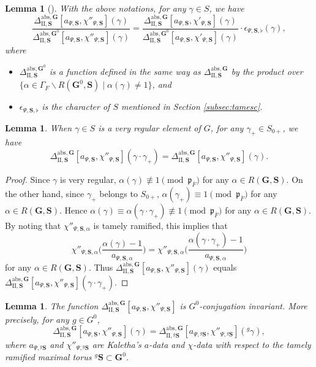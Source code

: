 \documentclass{amsart}
\newcommand{\abs}{\mathrm{abs}}
\newcommand{\ol}{\overline}
\newcommand{\mfp}{\mathfrak{p}}
\newcommand{\bfG}{\mathbf{G}}
\newcommand{\bfS}{\mathbf{S}}
\newcommand{\II}{\mathrm{II}}
\theoremstyle{plain}
\newtheorem{lem}[thm]{Lemma}
\theoremstyle{definition}
\theoremstyle{remark}
\theoremstyle{theorem}
\begin{document}
\begin{lem}[{\cite[(Proof of) Lemma 4.2.7]{FKS21}}]\label{lem:tran-diff}
With the above notations, for any $\gamma\in S$, we have
\[
\frac{\Delta_{\II,\bfS}^{\abs,\bfG}[a_{\Psi,\bfS},\chi''_{\Psi,\bfS}](\gamma)}{\Delta_{\II,\bfS}^{\abs,\bfG^{0}}[a_{\Psi,\bfS},\chi''_{\Psi,\bfS}](\gamma)}
=\frac{\Delta_{\II,\bfS}^{\abs,\bfG}[a_{\Psi,\bfS},\chi'_{\Psi,\bfS}](\gamma)}{\Delta_{\II,\bfS}^{\abs,\bfG^{0}}[a_{\Psi,\bfS},\chi'_{\Psi,\bfS}](\gamma)}
\cdot\epsilon_{\Psi,\bfS,\flat}(\gamma),
\]
where
\begin{itemize}
\item
$\Delta_{\II,\bfS}^{\abs,\bfG^{0}}$ is a function defined in the same way as $\Delta_{\II,\bfS}^{\abs,\bfG}$ by the product over $\{\alpha\in\Gamma_{F}\backslash R(\bfG^{0},\bfS) \mid \alpha(\gamma)\neq1\}$, and
\item
 $\epsilon_{\Psi,\bfS,\flat}$ is the character of $S$ mentioned in Section \ref{subsec:tamesc}.
 \end{itemize}
\end{lem}


\begin{lem}\label{lem:tran-translation}
When $\gamma\in S$ is a very regular element of $G$, for any $\gamma_{+}\in S_{0+}$, we have
\[
\Delta_{\II,\bfS}^{\abs,\bfG}[a_{\Psi,\bfS},\chi''_{\Psi,\bfS}](\gamma\cdot\gamma_{+})
=\Delta_{\II,\bfS}^{\abs,\bfG}[a_{\Psi,\bfS},\chi''_{\Psi,\bfS}](\gamma).
\]
\end{lem}

\begin{proof}
Since $\gamma$ is very regular, $\alpha(\gamma)\not\equiv1 \pmod{\mfp_{\ol{F}}}$ for any $\alpha\in R(\bfG,\bfS)$.
On the other hand, since $\gamma_{+}$ belongs to $S_{0+}$, $\alpha(\gamma_{+})\equiv1 \pmod{\mfp_{\ol{F}}}$ for any $\alpha\in R(\bfG,\bfS)$.
Hence $\alpha(\gamma)\equiv\alpha(\gamma\cdot\gamma_{+})\not\equiv1 \pmod{\mfp_{\ol{F}}}$ for any $\alpha\in R(\bfG,\bfS)$.
By noting that $\chi''_{\Psi,\bfS,\alpha}$ is tamely ramified, this implies that
\[
\chi''_{\Psi,\bfS,\alpha}\biggl(\frac{\alpha(\gamma)-1}{a_{\Psi,\bfS,\alpha}}\biggr)
=
\chi''_{\Psi,\bfS,\alpha}\biggl(\frac{\alpha(\gamma\cdot\gamma_{+})-1}{a_{\Psi,\bfS,\alpha}}\biggr)
\]
for any $\alpha\in R(\bfG,\bfS)$.
Thus $\Delta_{\II,\bfS}^{\abs,\bfG}[a_{\Psi,\bfS},\chi''_{\Psi,\bfS}](\gamma)$ equals $\Delta_{\II,\bfS}^{\abs,\bfG}[a_{\Psi,\bfS},\chi''_{\Psi,\bfS}](\gamma\cdot\gamma_{+})$.
\end{proof}

\begin{lem}\label{lem:tran-conj}
The function $\Delta_{\II,\bfS}^{\abs,\bfG}[a_{\Psi,\bfS},\chi''_{\Psi,\bfS}]$ is $G^{0}$-conjugation invariant.
More precisely, for any $g\in G^{0}$, 
\[
\Delta_{\II,\bfS}^{\abs,\bfG}[a_{\Psi,\bfS},\chi''_{\Psi,\bfS}](\gamma)
=\Delta_{\II,{}^{g}\bfS}^{\abs,\bfG}[a_{\Psi,{}^{g}\bfS},\chi''_{\Psi,{}^{g}\bfS}]({}^{g}\gamma),
\]
where $a_{\Psi,{}^{g}\bfS}$ and $\chi''_{\Psi,{}^{g}\bfS}$ are Kaletha's $a$-data and $\chi$-data with respect to the tamely ramified maximal torus ${}^{g}\bfS\subset\bfG^{0}$.
\end{lem}
\end{document}
